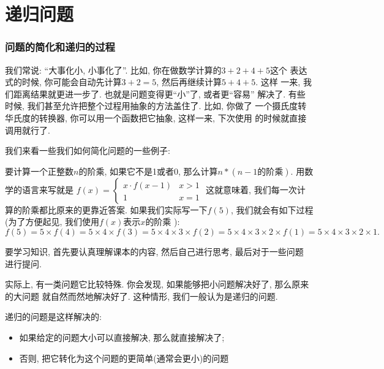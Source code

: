 \part{递归问题}

\section{问题的简化和递归的过程}

我们常说: ``大事化小, 小事化了''. 比如, 你在做数学计算的$3+2+4+5$这个
表达式的时候, 你可能会自动先计算$3+2=5$, 然后再继续计算$5+4+5$. 这样
一来, 我们距离结果就更进一步了. 也就是问题变得更``小''了, 或者更``容易''
解决了. 有些时候, 我们甚至允许把整个过程用抽象的方法盖住了. 比如, 你做了
一个摄氏度转华氏度的转换器, 你可以用一个函数把它抽象, 这样一来, 下次使用
的时候就直接调用就行了. 

我们来看一些我们如何简化问题的一些例子: 

\begin{example}
    要计算一个正整数$n$的阶乘, 如果它不是1或者0, 那么计算$n*(n-1\text{的阶乘})$.
    用数学的语言来写就是
    $f(x)=\begin{cases}
    x\cdot f(x-1) & x>1\\
    1 & x=1
    \end{cases}$
    这就意味着, 我们每一次计算的阶乘都比原来的更靠近答案. 如果我们实际写一下$f(5)$, 
    我们就会有如下过程(为了方便起见, 我们使用$f(x)$表示$x$的阶乘
    ): 
    $$
        f(5) = 5\times f(4) = 5\times 4\times f(3) = 5\times 4\times 3 \times f(2)
        = 5\times 4\times 3\times 2\times f(1) = 5\times 4\times 3\times 2\times 1.  
    $$
\end{example}

\begin{example}
    要学习知识, 首先要认真理解课本的内容, 然后自己进行思考, 最后对于一些问题
    进行提问. %
\end{example}


实际上, 有一类问题它比较特殊. 你会发现, 如果能够把小问题解决好了, 那么原来的大问题
就自然而然地解决好了. 这种情形, 我们一般认为是递归的问题. 

\begin{definition}
    递归的问题是这样解决的: 
    \begin{itemize}
        \item 如果给定的问题大小可以直接解决, 那么就直接解决了; 
        \item 否则, 把它转化为这个问题的更简单(通常会更小)的问题
    \end{itemize}
\end{definition}


